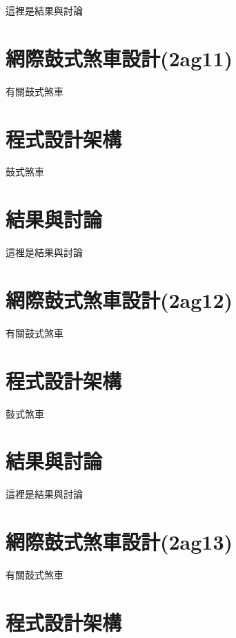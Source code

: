 \documentclass[]{article}
\begin{document}
這裡是結果與討論

\section{網際鼓式煞車設計(2ag11)}\label{ux7db2ux969bux9f13ux5f0fux715eux8ecaux8a2dux8a082ag11}

有關鼓式煞車

\section{程式設計架構}\label{ux7a0bux5f0fux8a2dux8a08ux67b6ux69cb-7}

鼓式煞車

\section{結果與討論}\label{ux7d50ux679cux8207ux8a0eux8ad6-7}

這裡是結果與討論

\section{網際鼓式煞車設計(2ag12)}\label{ux7db2ux969bux9f13ux5f0fux715eux8ecaux8a2dux8a082ag12}

有關鼓式煞車

\section{程式設計架構}\label{ux7a0bux5f0fux8a2dux8a08ux67b6ux69cb-8}

鼓式煞車

\section{結果與討論}\label{ux7d50ux679cux8207ux8a0eux8ad6-8}

這裡是結果與討論

\section{網際鼓式煞車設計(2ag13)}\label{ux7db2ux969bux9f13ux5f0fux715eux8ecaux8a2dux8a082ag13}

有關鼓式煞車

\section{程式設計架構}\label{ux7a0bux5f0fux8a2dux8a08ux67b6ux69cb-9}
\end{document}
